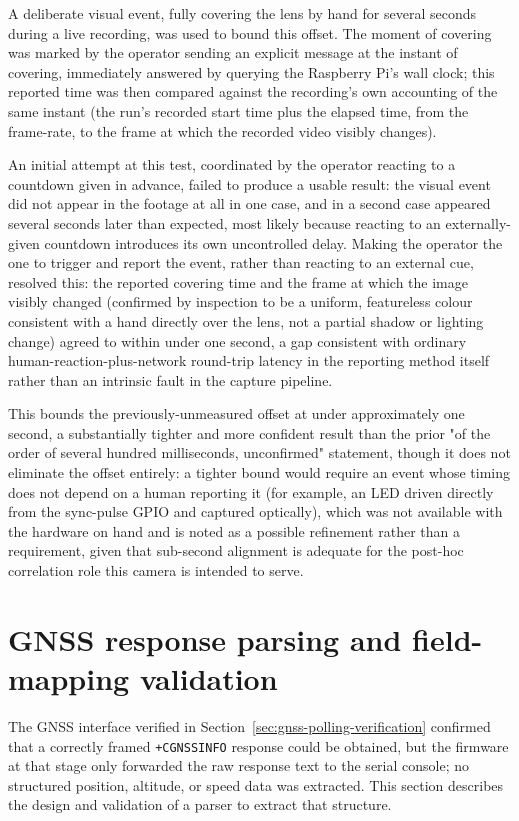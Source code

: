 A deliberate visual event, fully covering the lens by hand for several seconds during a live recording, was used to bound this offset. The moment of covering was marked by the operator sending an explicit message at the instant of covering, immediately answered by querying the Raspberry Pi's wall clock; this reported time was then compared against the recording's own accounting of the same instant (the run's recorded start time plus the elapsed time, from the frame-rate, to the frame at which the recorded video visibly changes).

An initial attempt at this test, coordinated by the operator reacting to a countdown given in advance, failed to produce a usable result: the visual event did not appear in the footage at all in one case, and in a second case appeared several seconds later than expected, most likely because reacting to an externally-given countdown introduces its own uncontrolled delay. Making the operator the one to trigger and report the event, rather than reacting to an external cue, resolved this: the reported covering time and the frame at which the image visibly changed (confirmed by inspection to be a uniform, featureless colour consistent with a hand directly over the lens, not a partial shadow or lighting change) agreed to within under one second, a gap consistent with ordinary human-reaction-plus-network round-trip latency in the reporting method itself rather than an intrinsic fault in the capture pipeline.

This bounds the previously-unmeasured offset at under approximately one second, a substantially tighter and more confident result than the prior "of the order of several hundred milliseconds, unconfirmed" statement, though it does not eliminate the offset entirely: a tighter bound would require an event whose timing does not depend on a human reporting it (for example, an LED driven directly from the sync-pulse GPIO and captured optically), which was not available with the hardware on hand and is noted as a possible refinement rather than a requirement, given that sub-second alignment is adequate for the post-hoc correlation role this camera is intended to serve.

\section{GNSS response parsing and field-mapping validation}
\label{sec:gnss-parsing-validation}

The GNSS interface verified in Section~\ref{sec:gnss-polling-verification} confirmed that a correctly framed \texttt{+CGNSSINFO} response could be obtained, but the firmware at that stage only forwarded the raw response text to the serial console; no structured position, altitude, or speed data was extracted. This section describes the design and validation of a parser to extract that structure.

